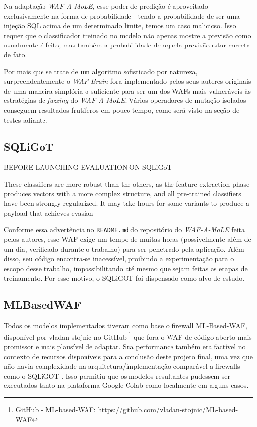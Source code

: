 Na adaptação \textit{WAF-A-MoLE}, esse poder de predição é aproveitado exclusivamente na forma de probabilidade - tendo a probabilidade de ser uma injeção SQL acima de um determinado limite, temos um caso malicioso. Isso requer que o classificador treinado no modelo não apenas mostre a previsão como usualmente é feito, mas também a probabilidade de aquela previsão estar correta de fato.

Por mais que se trate de um algoritmo sofisticado por natureza, surpreendentemente o \textit{WAF-Brain} fora implementado pelos seus autores originais de uma maneira simplória o suficiente para ser um dos WAFs mais vulneráveis às estratégias de \textit{fuzzing} do \textit{WAF-A-MoLE}. Vários operadores de mutação isolados conseguem resultados frutíferos em pouco tempo, como será visto na seção de testes adiante.

\subsection{SQLiGoT}

\begin{citacao}[english]
BEFORE LAUNCHING EVALUATION ON SQLiGoT

These classifiers are more robust than the others, as the feature extraction phase produces vectors with a more complex structure, and all pre-trained classifiers have been strongly regularized. It may take hours for some variants to produce a payload that achieves evasion
\end{citacao}
\bigskip

Conforme essa advertência no \verb+README.md+ do repositório do \textit{WAF-A-MoLE} feita pelos autores, esse WAF exige um tempo de muitas horas (possivelmente além de um dia, verificado durante o trabalho) para ser penetrado pela aplicação. Além disso, seu código encontra-se inacessível, proibindo a experimentação para o escopo desse trabalho, impossibilitando até mesmo que sejam feitas as etapas de treinamento. Por esse motivo, o SQLiGOT \cite{kar2016sqligot} foi dispensado como alvo de estudo.

\subsection{MLBasedWAF}
Todos os modelos implementados tiveram como base o firewall ML-Based-WAF, disponível por vladan-stojnic no \href{https://github.com/vladan-stojnic/ML-based-WAF}{GitHub} \footnote{GitHub - ML-based-WAF: https://github.com/vladan-stojnic/ML-based-WAF} \cite{ml_based_waf} que fora o WAF de código aberto mais promissor e mais plausível de adaptar. Sua performance também era factível no contexto de recursos disponíveis para a conclusão deste projeto final, uma vez que não havia complexidade na arquitetura/implementação comparável a firewalls como o SQLiGOT \cite{kar2016sqligot}. Isso permitiu que os modelos resultantes pudessem ser executados tanto na plataforma Google Colab como localmente em alguns casos.

